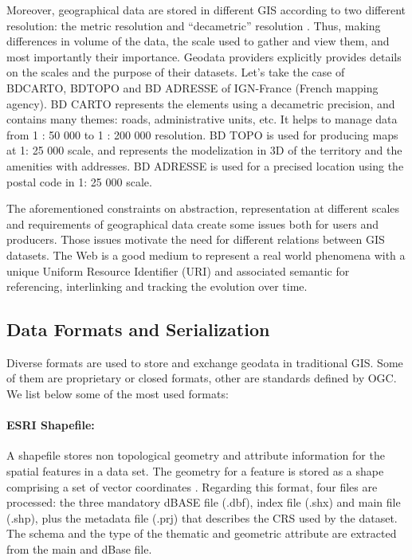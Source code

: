 Moreover, geographical data are stored in different GIS according to two different resolution: the metric resolution and ``decametric'' resolution \cite{anamaria08}. Thus, making differences in volume of the data, the scale used to gather and view them, and most importantly their importance. Geodata providers explicitly provides details on the scales and the purpose of their datasets. Let's take the case of BDCARTO\circledR \hspace{1pt}, BDTOPO\circledR \hspace{1pt} and BD ADRESSE\circledR \hspace{1pt} of IGN-France (French mapping agency). BD CARTO\circledR \hspace{1pt} represents the elements using a decametric precision, and contains many themes: roads, administrative units, etc. It helps to manage data from 1 : 50 000 to 1 : 200 000 resolution.  BD TOPO is used for producing maps at 1: 25 000 scale, and represents the modelization in 3D of the territory and the amenities with addresses. BD ADRESSE is used for a precised location using the postal code in 1: 25 000 scale. 

The aforementioned constraints on abstraction, representation at different scales and requirements of geographical data create some issues both for users and producers. Those issues motivate the need for different relations between GIS datasets. The Web is a good medium to represent a real world phenomena with a unique Uniform Resource Identifier (URI) and associated semantic for referencing, interlinking and tracking the evolution over time. 
 

\subsection{Data Formats and Serialization}
Diverse formats are used to store and exchange geodata in traditional GIS. Some of them are proprietary or closed formats, other are standards defined by OGC. We list below some of the most used formats:
 
 \paragraph{ESRI Shapefile:}
 
 A shapefile stores non topological geometry and attribute information for the spatial
features in a data set. The geometry for a feature is stored as a shape comprising a set of
vector coordinates \cite{esri98}. Regarding this format, four files are processed: the three mandatory dBASE file (.dbf), index file (.shx) and main file (.shp), plus the metadata file (.prj) that describes the CRS used by the dataset. The schema and the type of the thematic and geometric attribute are extracted from the main and dBase file.

